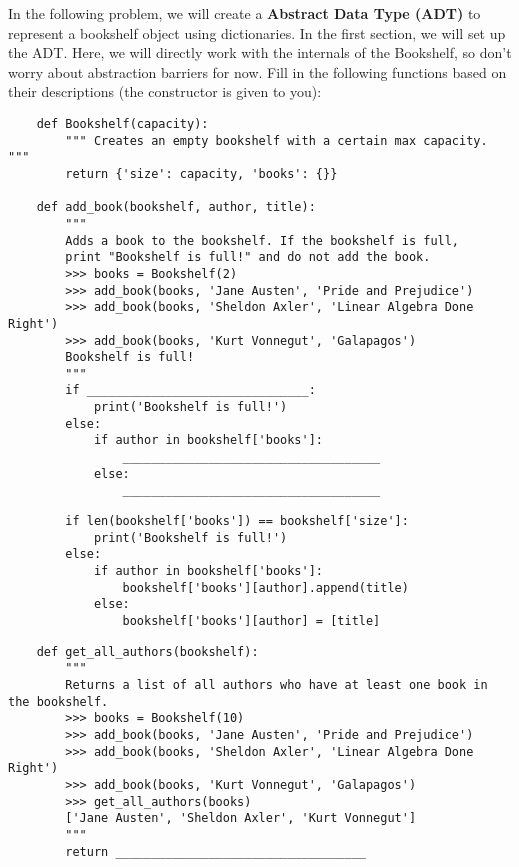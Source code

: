 
    In the following problem, we will create a \textbf{Abstract Data Type (ADT)} to represent 
    a bookshelf object using dictionaries.
    \newline
    \newline
    In the first section, we will set up the ADT. Here, we will directly work with the internals of the
    Bookshelf, so don't worry about abstraction barriers for now. Fill in the following functions based
    on their descriptions (the constructor is given to you):
    
    \begin{lstlisting}
    def Bookshelf(capacity):
        """ Creates an empty bookshelf with a certain max capacity. """
        return {'size': capacity, 'books': {}}

    def add_book(bookshelf, author, title):
        """
        Adds a book to the bookshelf. If the bookshelf is full,
        print "Bookshelf is full!" and do not add the book.
        >>> books = Bookshelf(2)
        >>> add_book(books, 'Jane Austen', 'Pride and Prejudice')
        >>> add_book(books, 'Sheldon Axler', 'Linear Algebra Done Right')
        >>> add_book(books, 'Kurt Vonnegut', 'Galapagos')
        Bookshelf is full!
        """
        if _______________________________:
            print('Bookshelf is full!')
        else:
            if author in bookshelf['books']:
                ____________________________________
            else:
                ____________________________________
    \end{lstlisting}


    \begin{solution}
        \begin{lstlisting}
        if len(bookshelf['books']) == bookshelf['size']:
            print('Bookshelf is full!')
        else:
            if author in bookshelf['books']:
                bookshelf['books'][author].append(title)
            else:
                bookshelf['books'][author] = [title]
        \end{lstlisting}
    \end{solution}

    \newpage
    \begin{lstlisting}
    def get_all_authors(bookshelf):
        """
        Returns a list of all authors who have at least one book in the bookshelf.
        >>> books = Bookshelf(10)
        >>> add_book(books, 'Jane Austen', 'Pride and Prejudice')
        >>> add_book(books, 'Sheldon Axler', 'Linear Algebra Done Right')
        >>> add_book(books, 'Kurt Vonnegut', 'Galapagos')
        >>> get_all_authors(books)
        ['Jane Austen', 'Sheldon Axler', 'Kurt Vonnegut']
        """
        return ___________________________________
    \end{lstlisting}

